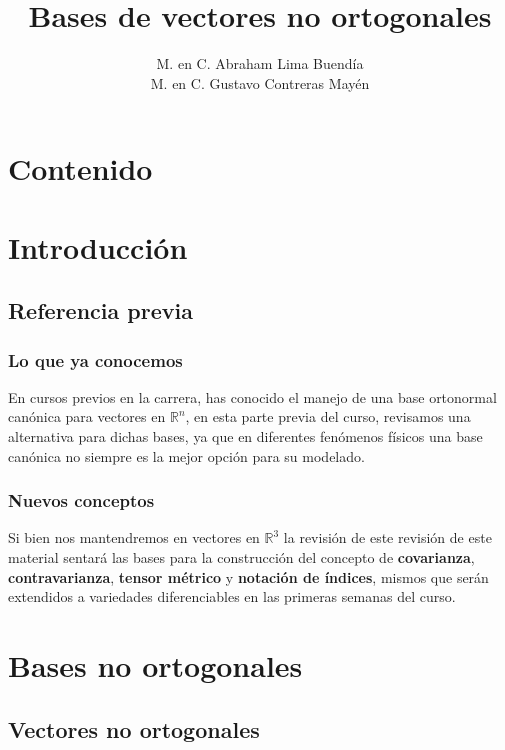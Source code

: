 \documentclass[12pt]{beamer}
\date{}
\title{Bases de vectores no ortogonales}
\author{M. en C. Abraham Lima Buendía \\ M. en C. Gustavo Contreras Mayén}
\begin{document}
\maketitle
\fontsize{14}{14}\selectfont
{}

\section*{Contenido}

\section{Introducción}
\subsection{Referencia previa}

\begin{frame}
\frametitle{Lo que ya conocemos}
En cursos previos en la carrera, has conocido el manejo de una base ortonormal canónica para vectores en $\mathbb{R}^{n}$, en esta parte previa del curso, revisamos una alternativa para dichas bases, ya que en diferentes fenómenos físicos una base canónica no siempre es la mejor opción para su modelado.
\end{frame}
\begin{frame}
\frametitle{Nuevos conceptos}
Si bien nos mantendremos en vectores en $\mathbb{R}^{3}$ la revisión de este revisión de este material sentará las bases para la construcción del concepto de \textbf{covarianza}, \textbf{contravarianza}, \textbf{tensor métrico} y \textbf{notación de índices}, mismos que serán extendidos a variedades diferenciables en las primeras semanas del curso.
\end{frame}

\section{Bases no ortogonales}
\subsection{Vectores no ortogonales}
\end{document}
